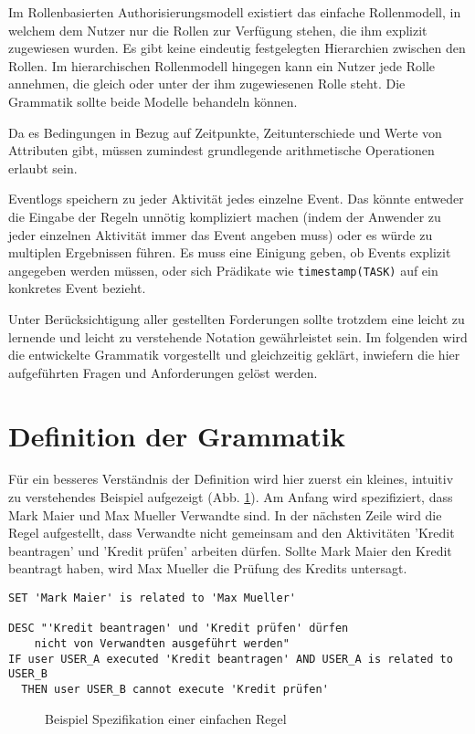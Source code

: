 Im Rollenbasierten Authorisierungsmodell existiert das einfache Rollenmodell, in welchem dem Nutzer nur die Rollen zur Verfügung stehen, die ihm explizit zugewiesen wurden. Es gibt keine eindeutig festgelegten Hierarchien zwischen den Rollen. Im hierarchischen Rollenmodell hingegen kann ein Nutzer jede Rolle annehmen, die gleich oder unter der ihm zugewiesenen Rolle steht. Die Grammatik sollte beide Modelle behandeln können.

Da es Bedingungen in Bezug auf Zeitpunkte, Zeitunterschiede und Werte von Attributen gibt, müssen zumindest grundlegende arithmetische Operationen erlaubt sein.

Eventlogs speichern zu jeder Aktivität jedes einzelne Event. Das könnte entweder die Eingabe der Regeln unnötig kompliziert machen (indem der Anwender zu jeder einzelnen Aktivität immer das Event angeben muss) oder es würde zu multiplen Ergebnissen führen. Es muss eine Einigung geben, ob Events explizit angegeben werden müssen, oder sich Prädikate wie \texttt{timestamp(TASK)} auf ein konkretes Event bezieht.

Unter Berücksichtigung aller gestellten Forderungen sollte trotzdem eine leicht zu lernende und leicht zu verstehende Notation gewährleistet sein. Im folgenden wird die entwickelte Grammatik vorgestellt und gleichzeitig geklärt, inwiefern die hier aufgeführten Fragen und Anforderungen gelöst werden.
%
%
\section{Definition der Grammatik}
Für ein besseres Verständnis der Definition wird hier zuerst ein kleines, intuitiv zu verstehendes Beispiel aufgezeigt (Abb. \ref{fig:demorulefile}). Am Anfang wird spezifiziert, dass Mark Maier und Max Mueller Verwandte sind. In der nächsten Zeile wird die Regel aufgestellt, dass Verwandte nicht gemeinsam and den Aktivitäten 'Kredit beantragen' und 'Kredit prüfen' arbeiten dürfen. Sollte Mark Maier den Kredit beantragt haben, wird Max Mueller die Prüfung des Kredits untersagt.\\

\begin{verbatim}
SET 'Mark Maier' is related to 'Max Mueller'

DESC "'Kredit beantragen' und 'Kredit prüfen' dürfen 
	nicht von Verwandten ausgeführt werden"
IF user USER_A executed 'Kredit beantragen' AND USER_A is related to USER_B
  THEN user USER_B cannot execute 'Kredit prüfen'
\end{verbatim}
\begin{figure}[!h]
\caption{Beispiel Spezifikation einer einfachen Regel}
\label{fig:demorulefile}
\end{figure}


